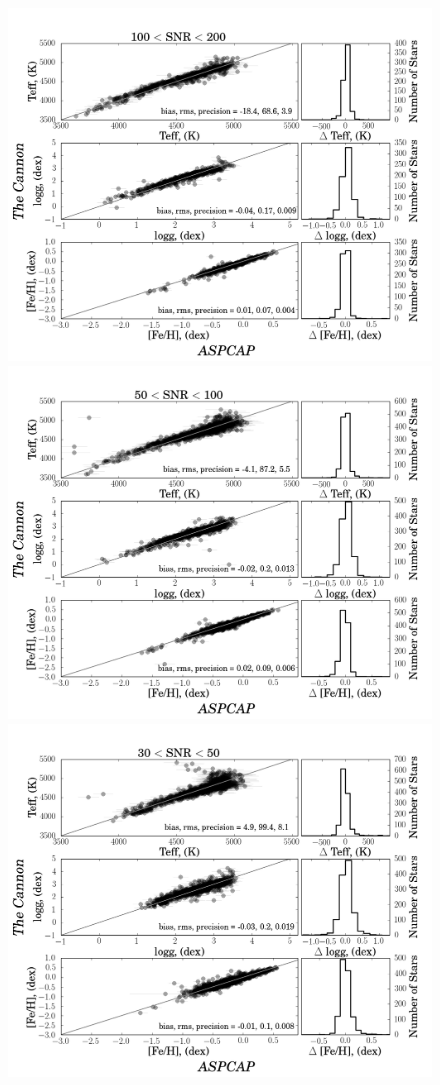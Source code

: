 \documentclass[12pt, preprint]{aastex}
\begin{document}
\begin{figure}[!h]
\centering
\includegraphics[scale=0.25]{./plots/SNR100to200.png}
\includegraphics[scale=0.25]{./plots/SNR50to100.png}\\
\includegraphics[scale=0.25]{./plots/SNR30to50.png}

\end{figure}
\end{document}
